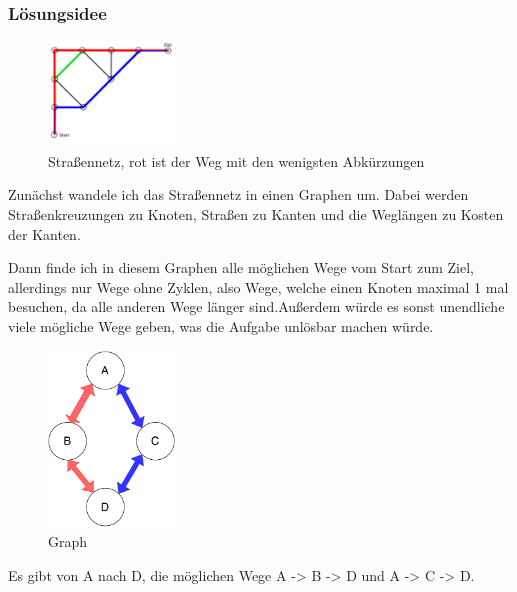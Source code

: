 \documentclass[a4paper,12pt,arial]{scrartcl}
\begin{document}
\subsubsection{Lösungsidee}
\captionsetup[figure]{name=Abb.}
\begin{figure}
    \vspace{-20pt}
    \includegraphics[width=0.3\textwidth]{aufgabe3.pdf}
    \caption{Straßennetz, rot ist der Weg mit den wenigsten Abkürzungen}
    \label{fig:abbiegen}
\end{figure}
\captionsetup[figure]{name=Abbildung}
Zunächst wandele ich das Straßennetz in einen Graphen um. Dabei werden
Straßenkreuzungen zu Knoten,  Straßen zu  Kanten und die Weglängen zu Kosten der Kanten.

\par
Dann finde ich in diesem Graphen alle möglichen Wege vom Start zum Ziel, allerdings nur Wege ohne Zyklen, also Wege, welche einen Knoten maximal 1 mal besuchen, da alle anderen Wege länger sind.Außerdem würde es sonst unendliche viele mögliche Wege geben, was die Aufgabe unlösbar machen würde.

\begin{figure}
    \centering
    \includegraphics[width=0.3\textwidth]{small_example_graph.pdf}
    \caption{Graph}
    \label{fig:abbiegen}
    \vspace{-30pt}
\end{figure}
\par
Es gibt von A nach D, die möglichen Wege A -> B -> D und A -> C -> D.
\end{document}
